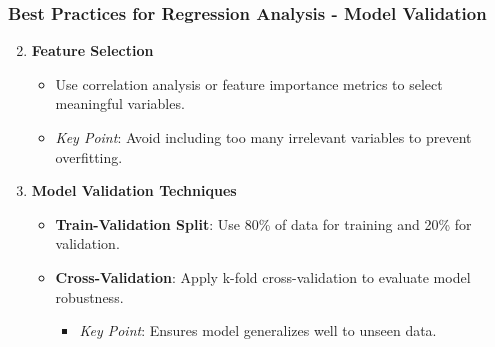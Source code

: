 \documentclass[aspectratio=169]{beamer}
\begin{document}
\begin{frame}[fragile]
    \frametitle{Best Practices for Regression Analysis - Model Validation}
    \begin{enumerate}
        \setcounter{enumi}{1}
        \item \textbf{Feature Selection}
        \begin{itemize}
            \item Use correlation analysis or feature importance metrics to select meaningful variables.
            \item \textit{Key Point}: Avoid including too many irrelevant variables to prevent overfitting.
        \end{itemize}
        
        \item \textbf{Model Validation Techniques}
        \begin{itemize}
            \item \textbf{Train-Validation Split}: Use 80\% of data for training and 20\% for validation.
            \item \textbf{Cross-Validation}: Apply k-fold cross-validation to evaluate model robustness.
            \begin{itemize}
                \item \textit{Key Point}: Ensures model generalizes well to unseen data.
            \end{itemize}
        \end{itemize}
    \end{enumerate}
\end{frame}
\end{document}
